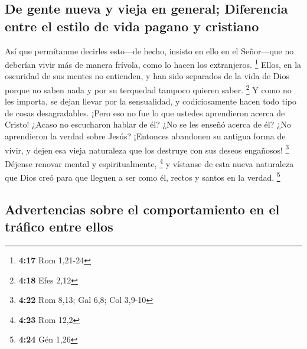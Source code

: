 \hypertarget{de-gente-nueva-y-vieja-en-general-diferencia-entre-el-estilo-de-vida-pagano-y-cristiano}{%
\subsection{De gente nueva y vieja en general; Diferencia entre el
estilo de vida pagano y
cristiano}\label{de-gente-nueva-y-vieja-en-general-diferencia-entre-el-estilo-de-vida-pagano-y-cristiano}}

 Así que permítanme decirles esto---de hecho, insisto en
ello en el Señor---que no deberían vivir más de manera frívola, como lo
hacen los extranjeros. \footnote{\textbf{4:17} Rom 1,21-24}
 Ellos, en la oscuridad de sus mentes no entienden, y han
sido separados de la vida de Dios porque no saben nada y por su
terquedad tampoco quieren saber. \footnote{\textbf{4:18} Efes 2,12}
 Y como no les importa, se dejan llevar por la
sensualidad, y codiciosamente hacen todo tipo de cosas desagradables.
 ¡Pero eso no fue lo que ustedes aprendieron acerca de
Cristo!  ¿Acaso no escucharon hablar de él? ¿No se les
enseñó acerca de él? ¿No aprendieron la verdad sobre Jesús?
 ¡Entonces abandonen su antigua forma de vivir, y dejen
esa vieja naturaleza que los destruye con sus deseos engañosos!
\footnote{\textbf{4:22} Rom 8,13; Gal 6,8; Col 3,9-10} 
Déjense renovar mental y espiritualmente, \footnote{\textbf{4:23} Rom
  12,2}  y vístanse de esta nueva naturaleza que Dios
creó para que lleguen a ser como él, rectos y santos en la verdad.
\footnote{\textbf{4:24} Gén 1,26}

\hypertarget{advertencias-sobre-el-comportamiento-en-el-truxe1fico-entre-ellos}{%
\subsection{Advertencias sobre el comportamiento en el tráfico entre
ellos}\label{advertencias-sobre-el-comportamiento-en-el-truxe1fico-entre-ellos}}

